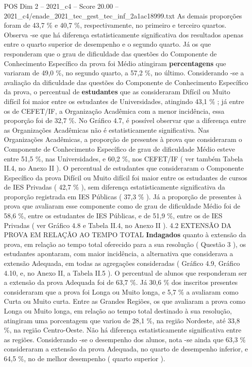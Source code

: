 \begin{textsample}{POS Dim 2 – 2021\_c4 – Score 20.00 – 2021\_c4/enade\_2021\_tec\_gest\_tec\_inf\_2a1ac18999.txt}
As demais proporções foram de 43,7 \% e 40,7 \%, respectivamente, no primeiro e terceiro quartos.
Observa -se que há diferença estatisticamente significativa dos resultados apenas entre o quarto superior de desempenho e o segundo quarto.
Já os que responderam que o grau de dificuldade das questões do Componente de Conhecimento Específico da prova foi Médio atingiram \textbf{percentagens} que variaram de 49,0 \%, no segundo quarto, a 57,2 \%, no último.
Considerando -se a avaliação da dificuldade das questões do Componente de Conhecimento Específico da prova, o percentual de \textbf{estudantes} que as consideraram Difícil ou Muito difícil foi maior entre os estudantes de Universidades, atingindo 43,1 \% ; já entre os de CEFET/IF, a Organização Acadêmica com a menor incidência, essa proporção foi de 32,7 \%.
No Gráfico 4.7, é possível observar que a diferença entre as Organizações Acadêmicas não é estatisticamente significativa.
Nas Organizações Acadêmicas, a proporção de presentes à prova que consideraram o Componente de Conhecimento Específico de grau de dificuldade Médio esteve entre 51,5 \%, nas Universidades, e 60,2 \%, nos CEFET/IF ( ver também Tabela II.4, no Anexo II ).
O percentual de estudantes que consideraram o Componente Específico da prova Difícil ou Muito difícil foi maior entre os estudantes de cursos de IES Privadas ( 42,7 \% ), sem diferença estatisticamente significativa da proporção registrada em IES Públicas ( 37,3 \% ).
Já a proporção de presentes à prova que avaliaram esse componente como de grau de dificuldade Médio foi de 58,6 \%, entre os estudantes de IES Públicas, e de 51,9 \%, entre os de IES Privadas ( ver Gráfico 4.8 e Tabela II.4, no Anexo II ). 4.2 EXTENSÃO DA PROVA EM RELAÇÃO AO TEMPO TOTAL \textbf{Indagados} quanto à extensão da prova, em relação ao tempo total oferecido para a sua resolução ( Questão 3 ), os estudantes apontaram, com maior incidência, a alternativa que considerava a extensão Adequada, em todas as agregações consideradas ( Gráfico 4.9, Gráfico 4.10, e, no Anexo II, a Tabela II.5 ).
O percentual de alunos que responderam ser a extensão da prova Adequada foi de 63,7 \%.
Já 30,6 \% dos inscritos presentes consideraram que a prova foi Longa ou Muito longa, e 5,7 \% a avaliaram como Curta ou Muito curta.
Entre as Grandes Regiões, os que avaliaram a prova como Longa ou Muito longa, em relação ao tempo total destinado à sua resolução, atingiram uma porcentagem que variou de 28,1 \%, na região Nordeste, até 33,8 \%, na região Centro-Oeste.
Não há diferença estatisticamente significativa entre as regiões.
Considerando -se o desempenho dos alunos, nota -se ainda que 63,3 \% consideraram a extensão da prova Adequada, no quarto de desempenho inferior, e 64,5 \%, no de melhor desempenho ( quarto superior ).

\end{textsample}
